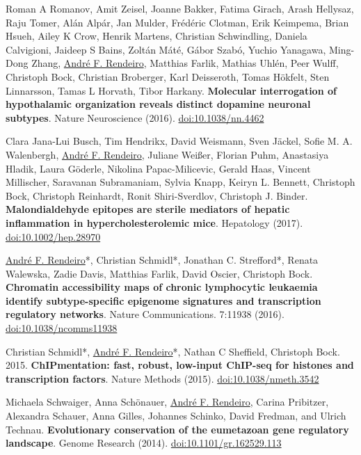 \documentclass[11pt,a4paper,roman]{moderncv} %
\begin{document}
\begin{etaremune}[leftmargin=1.0cm, itemindent=0pt, topsep=10pt, itemsep=2pt, partopsep=0pt, parsep=0pt]
        \item Roman A Romanov, Amit Zeisel, Joanne Bakker, Fatima Girach, Arash Hellysaz, Raju Tomer, Alán Alpár, Jan Mulder, Frédéric Clotman, Erik Keimpema, Brian Hsueh, Ailey K Crow, Henrik Martens, Christian Schwindling, Daniela Calvigioni, Jaideep S Bains, Zoltán Máté, Gábor Szabó, Yuchio Yanagawa, Ming-Dong Zhang, \underline{André F. Rendeiro}, Matthias Farlik, Mathias Uhlén, Peer Wulff, Christoph Bock, Christian Broberger, Karl Deisseroth, Tomas Hökfelt, Sten Linnarsson, Tamas L Horvath, Tibor Harkany. \textbf{Molecular interrogation of hypothalamic organization reveals distinct dopamine neuronal subtypes}. Nature Neuroscience (2016).
        \href{https://dx.doi.org/10.1038/nn.4462}{doi:10.1038/nn.4462}

        \item Clara Jana-Lui Busch, Tim Hendrikx, David Weismann, Sven Jäckel, Sofie M. A. Walenbergh, \underline{André F. Rendeiro}, Juliane Weißer, Florian Puhm, Anastasiya Hladik, Laura Göderle, Nikolina Papac-Milicevic, Gerald Haas, Vincent Millischer, Saravanan Subramaniam, Sylvia Knapp, Keiryn L. Bennett, Christoph Bock, Christoph Reinhardt, Ronit Shiri-Sverdlov, Christoph J. Binder. \textbf{Malondialdehyde epitopes are sterile mediators of hepatic inflammation in hypercholesterolemic mice}. Hepatology (2017).
        \href{https://dx.doi.org/10.1002/hep.28970}{doi:10.1002/hep.28970}

        \item \underline{André F. Rendeiro}*, Christian Schmidl*, Jonathan C. Strefford*, Renata Walewska, Zadie Davis, Matthias Farlik, David Oscier, Christoph Bock. \textbf{Chromatin accessibility maps of chronic lymphocytic leukaemia identify subtype-specific epigenome signatures and transcription regulatory networks}. Nature Communications. 7:11938 (2016).
        \href{https://dx.doi.org/10.1038/ncomms11938}{doi:10.1038/ncomms11938}

        \item Christian Schmidl*, \underline{André F. Rendeiro}*,	Nathan C Sheffield, Christoph Bock. 2015. \textbf{ChIPmentation: fast, robust, low-input ChIP-seq for histones and transcription factors}. Nature Methods (2015).
        \href{https://dx.doi.org/10.1038/nmeth.3542}{doi:10.1038/nmeth.3542}

        \item Michaela Schwaiger, Anna Schönauer, \underline{André F. Rendeiro}, Carina Pribitzer, Alexandra Schauer, Anna Gilles, Johannes Schinko, David Fredman, and Ulrich Technau. \textbf{Evolutionary conservation of the eumetazoan gene regulatory landscape}. Genome Research (2014).
        \href{https://dx.doi.org/10.1101/gr.162529.113}{doi:10.1101/gr.162529.113}

        \end{etaremune}
\end{document}
